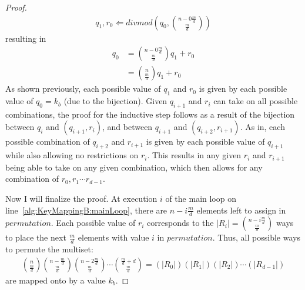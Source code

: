 \begin{proof}
\begin{align}
q_{1},r_0 \Longleftarrow \mathit{divmod}\left(q_0,{n - 0\frac{m}{d} \choose \frac{m}{d}}\right)
\end{align}
resulting in
\begin{align}
q_{0} &= {n - 0\frac{m}{d} \choose \frac{m}{d}}q_{1} + r_{0} \\
&= {n \choose \frac{m}{d}}q_{1} + r_{0}
\end{align}
As shown previously, each possible value of $q_1$ and $r_0$ is given by each possible value of $q_0 = k_b$ (due to the bijection). Given $q_{i+1}$ and $r_i$ can take on all possible combinations, the proof for the inductive step follows as a result of the bijection between $q_{i}$ and $(q_{i+1}, r_i)$, and between $q_{i+1}$ and $(q_{i+2}, r_{i+1})$. As in, each possible combination of $q_{i+2}$ and $r_{i+1}$ is given by each possible value of $q_{i+1}$ while also allowing no restrictions on $r_i$. This results in any given $r_i$ and $r_{i+1}$ being able to take on any given combination, which then allows for any combination of $r_0,r_1 \cdots r_{d-1}$.

Now I will finalize the proof. At execution $i$ of the main loop on line~\ref{alg:KeyMappingB:mainLoop}, there are $n - i\frac{m}{d}$ elements left to assign in $permutation$. Each possible value of $r_i$ corresponds to the $\lvert R_i \rvert = {n - i\frac{m}{d} \choose \frac{m}{d}}$ ways to place the next $\frac{m}{d}$ elements with value $i$ in $permutation$. Thus, all possible ways to permute the multiset:
\begin{align}
{n \choose \frac{m}{d}}{n - \frac{m}{d} \choose \frac{m}{d}}{n - 2\frac{m}{d} \choose \frac{m}{d}}\cdots{\frac{m}{d} + d \choose \frac{m}{d}} = (\lvert R_0 \rvert)(\lvert R_1 \rvert)(\lvert R_2 \rvert)\cdots(\lvert R_{d-1} \rvert)
\end{align}
are mapped onto by a value $k_b$.
\end{proof}

